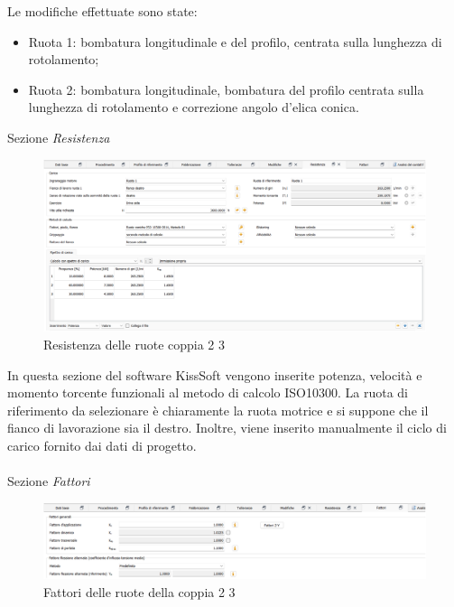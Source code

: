 Le modifiche effettuate sono state:
\begin{itemize}
    \item Ruota 1: bombatura longitudinale e del profilo, centrata sulla lunghezza di rotolamento;
    \item Ruota 2: bombatura longitudinale, bombatura del profilo centrata sulla lunghezza di rotolamento e correzione angolo d'elica conica. 
\end{itemize}
\newpage
Sezione \emph{Resistenza}
\begin{figure}[h]
    \centering
    \includegraphics[scale=0.47]{Immagini/ResistenzaCoppia23.png}
    \caption{Resistenza delle ruote coppia 2 3}
    \label{fig:ResistenzaCoppia23}
\end{figure}

In questa sezione del software KissSoft vengono inserite potenza, velocità e momento torcente funzionali al metodo di calcolo ISO10300. La ruota di riferimento da selezionare è chiaramente la ruota motrice e si suppone che il fianco di lavorazione sia il destro. Inoltre, viene inserito manualmente il ciclo di carico fornito dai dati di progetto.\\
\\
Sezione \emph{Fattori}
\begin{figure}[h]
    \centering
    \includegraphics[scale=0.45]{Immagini/FattoriCoppia23.png}
    \caption{Fattori delle ruote della coppia 2 3}
    \label{fig:FattoriCoppia01}
\end{figure}


